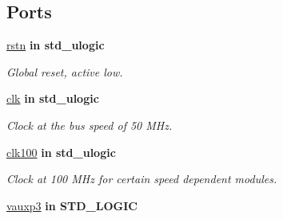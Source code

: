 \subsection*{Ports}
 \begin{DoxyCompactItemize}
\item 
\hypertarget{classdummyapb_a8fb8388e1e2f3ac69332573f5909b4e8}{\hyperlink{classdummyapb_a8fb8388e1e2f3ac69332573f5909b4e8}{rstn}  {\bfseries {\bfseries \textcolor{vhdlkeyword}{in}\textcolor{vhdlchar}{ }}} {\bfseries \textcolor{comment}{std\-\_\-ulogic}\textcolor{vhdlchar}{ }} }\label{classdummyapb_a8fb8388e1e2f3ac69332573f5909b4e8}

\begin{DoxyCompactList}\small\item\em Global reset, active low. \end{DoxyCompactList}\item 
\hypertarget{classdummyapb_af1c59ef8e5ba3edeeb313b4be18d7d8a}{\hyperlink{classdummyapb_af1c59ef8e5ba3edeeb313b4be18d7d8a}{clk}  {\bfseries {\bfseries \textcolor{vhdlkeyword}{in}\textcolor{vhdlchar}{ }}} {\bfseries \textcolor{comment}{std\-\_\-ulogic}\textcolor{vhdlchar}{ }} }\label{classdummyapb_af1c59ef8e5ba3edeeb313b4be18d7d8a}

\begin{DoxyCompactList}\small\item\em Clock at the bus speed of 50 M\-Hz. \end{DoxyCompactList}\item 
\hypertarget{classdummyapb_acfb2eee7a14b6192c7945bbb7ba640fa}{\hyperlink{classdummyapb_acfb2eee7a14b6192c7945bbb7ba640fa}{clk100}  {\bfseries {\bfseries \textcolor{vhdlkeyword}{in}\textcolor{vhdlchar}{ }}} {\bfseries \textcolor{comment}{std\-\_\-ulogic}\textcolor{vhdlchar}{ }} }\label{classdummyapb_acfb2eee7a14b6192c7945bbb7ba640fa}

\begin{DoxyCompactList}\small\item\em Clock at 100 M\-Hz for certain speed dependent modules. \end{DoxyCompactList}\item 
\hypertarget{classdummyapb_af2205ffee98e5aeaa144186159740393}{\hyperlink{classdummyapb_af2205ffee98e5aeaa144186159740393}{vauxp3}  {\bfseries {\bfseries \textcolor{vhdlkeyword}{in}\textcolor{vhdlchar}{ }}} {\bfseries \textcolor{comment}{S\-T\-D\-\_\-\-L\-O\-G\-I\-C}\textcolor{vhdlchar}{ }} }\label{classdummyapb_af2205ffee98e5aeaa144186159740393}


\end{DoxyCompactItemize}
